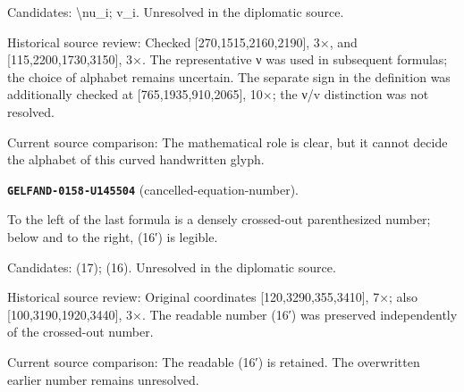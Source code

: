 Candidates: \textbackslash{}nu\_i; v\_i. Unresolved in the diplomatic source.\par
Historical source review: Checked [270,1515,2160,2190], 3×, and [115,2200,1730,3150], 3×. The representative ν was used in subsequent formulas; the choice of alphabet remains uncertain. The separate sign in the definition was additionally checked at [765,1935,910,2065], 10×; the ν/v distinction was not resolved.\par
Current source comparison: The mathematical role is clear, but it cannot decide the alphabet of this curved handwritten glyph.\par\medskip
\par\noindent\leavevmode{}\label{GELFAND-0158-U145504}\label{GELFAND-P001455:cancelled-equation-number}\textbf{\texttt{GELFAND-0158-U145504}} (cancelled-equation-number).\nopagebreak[4]\par
To the left of the last formula is a densely crossed-out parenthesized number; below and to the right, (16′) is legible.\par
Candidates: (17); (16). Unresolved in the diplomatic source.\par
Historical source review: Original coordinates [120,3290,355,3410], 7×; also [100,3190,1920,3440], 3×. The readable number (16′) was preserved independently of the crossed-out number.\par
Current source comparison: The readable (16′) is retained. The overwritten earlier number remains unresolved.\par\medskip
